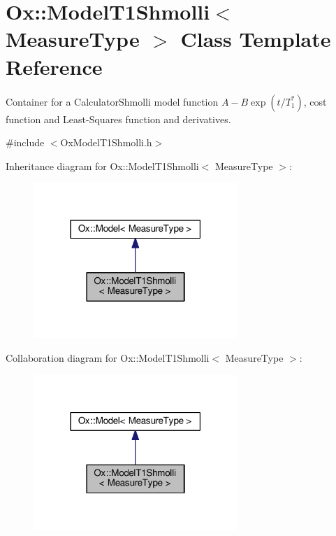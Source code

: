 \hypertarget{class_ox_1_1_model_t1_shmolli}{}\section{Ox\+:\+:Model\+T1\+Shmolli$<$ Measure\+Type $>$ Class Template Reference}
\label{class_ox_1_1_model_t1_shmolli}


Container for a Calculator\+Shmolli model function $ A-B\exp(t/T_1^*) $, cost function and Least-\/\+Squares function and derivatives.  




{\ttfamily \#include $<$Ox\+Model\+T1\+Shmolli.\+h$>$}



Inheritance diagram for Ox\+:\+:Model\+T1\+Shmolli$<$ Measure\+Type $>$\+:
\nopagebreak
\begin{figure}[H]
\begin{center}
\leavevmode
\includegraphics[width=219pt]{class_ox_1_1_model_t1_shmolli__inherit__graph}
\end{center}
\end{figure}


Collaboration diagram for Ox\+:\+:Model\+T1\+Shmolli$<$ Measure\+Type $>$\+:
\nopagebreak
\begin{figure}[H]
\begin{center}
\leavevmode
\includegraphics[width=219pt]{class_ox_1_1_model_t1_shmolli__coll__graph}
\end{center}
\end{figure}
